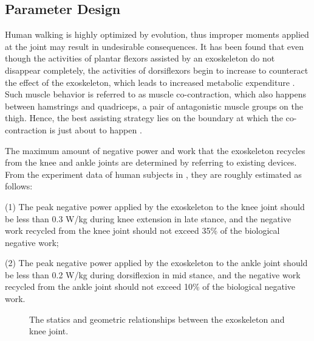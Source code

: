 \documentclass[10pt]{asme2ej}
\begin{document}
\subsection{Parameter Design}

\label{sec:parameter design}

Human walking is highly optimized by evolution, thus improper moments applied at the joint may result in undesirable consequences.
It has been found that even though the activities of plantar flexors assisted by an exoskeleton do not disappear completely, the activities of dorsiflexors begin to increase to counteract the effect of the exoskeleton, which leads to increased metabolic expenditure \cite{RN4}.
Such muscle behavior is referred to as muscle co-contraction, which also happens between hamstrings and quadriceps, a pair of antagonistic muscle groups on the thigh.
Hence, the best assisting strategy lies on the boundary at which the co-contraction is just about to happen \cite{RN22}. 

The maximum amount of negative power and work that the exoskeleton recycles from the knee and ankle joints are determined by referring to existing devices.
From the experiment data of human subjects in \cite{RN5,RN18}, they are roughly estimated as follows:

(1) The peak negative power applied by the exoskeleton to the knee joint should be less than 0.3 W/kg during knee extension in late stance, and the negative work recycled from the knee joint should not exceed 35\% of the biological negative work;

(2) The peak negative power applied by the exoskeleton to the ankle joint should be less than 0.2 W/kg during dorsiflexion in mid stance, and the negative work recycled from the ankle joint should not exceed 10\% of the biological negative work.

\begin{figure}[t]
	\caption{The statics and geometric relationships between the exoskeleton and knee joint.}
	\label{fig:kneeparameters}
\end{figure}
\end{document}

